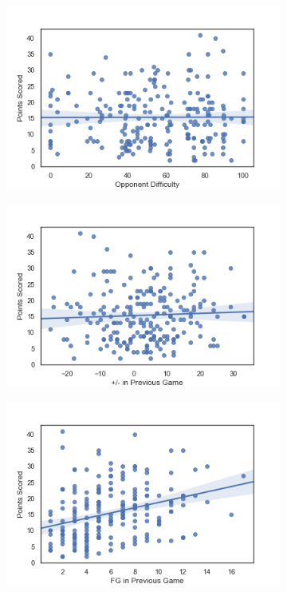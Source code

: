 \documentclass[a4paper,11pt,twoside]{article}
\begin{document}
\begin{figure} [h!]
  \centering
  \begin{subfigure}[b]{0.32\textwidth}
    \includegraphics[width=\textwidth]{../opp.png}
    \label{fig:4}
  \end{subfigure}
  \begin{subfigure}[b]{0.32\textwidth}
    \includegraphics[width=\textwidth]{../pminus_pts.png}
    \label{fig:5}
  \end{subfigure}
  \begin{subfigure}[b]{0.32\textwidth}
    \includegraphics[width=\textwidth]{../fgoals_pts.png}
    \label{fig:6}
  \end{subfigure}
  \label{fig:7}
\end{figure}
\end{document}
